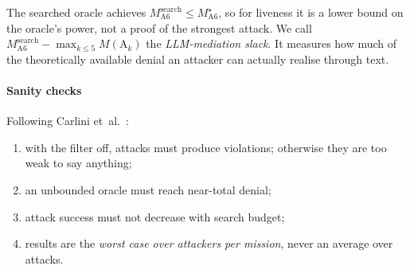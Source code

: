 The searched oracle achieves $M_{\mathrm{A6}}^{\mathrm{search}}\le M^\star_{\mathrm{A6}}$,
so for liveness it is a lower bound on the oracle's power, not a proof of the
strongest attack. We call
$M_{\mathrm{A6}}^{\mathrm{search}}-\max_{k\le5}M(\mathrm A_k)$ the
\emph{LLM-mediation slack}. It measures how much of the theoretically
available denial an attacker can actually realise through text.

\paragraph{Sanity checks}
Following Carlini et~al.~\cite{carlini2019evaluating}:
\begin{enumerate}[label=(\roman*)]
\item with the filter off, attacks must produce violations; otherwise they
  are too weak to say anything;
\item an unbounded oracle must reach near-total denial;
\item attack success must not decrease with search budget;
\item results are the \emph{worst case over attackers per mission}, never an
  average over attacks.
\end{enumerate}

